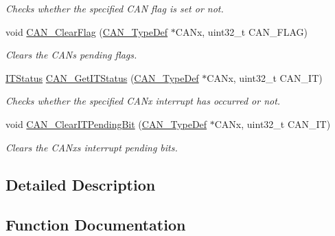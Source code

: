 \begin{DoxyCompactItemize}
\begin{DoxyCompactList}\small\item\em Checks whether the specified C\+AN flag is set or not. \end{DoxyCompactList}\item 
void \hyperlink{group___c_a_n___private___functions_ga2c01646d5d3a2d7045e8dd71f58f8742}{C\+A\+N\+\_\+\+Clear\+Flag} (\hyperlink{struct_c_a_n___type_def}{C\+A\+N\+\_\+\+Type\+Def} $\ast$C\+A\+Nx, uint32\+\_\+t C\+A\+N\+\_\+\+F\+L\+AG)
\begin{DoxyCompactList}\small\item\em Clears the C\+AN\textquotesingle{}s pending flags. \end{DoxyCompactList}\item 
\hyperlink{group___exported__types_gaacbd7ed539db0aacd973a0f6eca34074}{I\+T\+Status} \hyperlink{group___c_a_n___private___functions_ga9aca05b3013e1b3438f3559f80b33c82}{C\+A\+N\+\_\+\+Get\+I\+T\+Status} (\hyperlink{struct_c_a_n___type_def}{C\+A\+N\+\_\+\+Type\+Def} $\ast$C\+A\+Nx, uint32\+\_\+t C\+A\+N\+\_\+\+IT)
\begin{DoxyCompactList}\small\item\em Checks whether the specified C\+A\+Nx interrupt has occurred or not. \end{DoxyCompactList}\item 
void \hyperlink{group___c_a_n___private___functions_ga30bf7ac0c1793f6622a4a1adbb7dbc8a}{C\+A\+N\+\_\+\+Clear\+I\+T\+Pending\+Bit} (\hyperlink{struct_c_a_n___type_def}{C\+A\+N\+\_\+\+Type\+Def} $\ast$C\+A\+Nx, uint32\+\_\+t C\+A\+N\+\_\+\+IT)
\begin{DoxyCompactList}\small\item\em Clears the C\+A\+Nx\textquotesingle{}s interrupt pending bits. \end{DoxyCompactList}\end{DoxyCompactItemize}


\subsection{Detailed Description}


\subsection{Function Documentation}
\mbox{\label{group___c_a_n___private___functions_ga81106cdf5395a1947bfc87ec1685829e}} 
